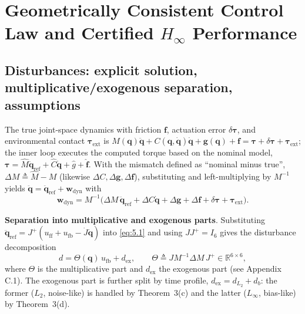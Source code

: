 \section{Geometrically Consistent Control Law and Certified $H_\infty$ Performance}

\subsection{Disturbances: explicit solution, multiplicative/exogenous separation, assumptions}

The true joint-space dynamics with friction $\boldsymbol f$, actuation error $\delta\boldsymbol\tau$, and environmental contact $\boldsymbol\tau_{\mathrm{ext}}$ is
$M(\boldsymbol q)\ddot{\boldsymbol q}+C(\boldsymbol q,\dot{\boldsymbol q})\dot{\boldsymbol q}+\boldsymbol g(\boldsymbol q)+\boldsymbol f=\boldsymbol\tau+\delta\boldsymbol\tau+\boldsymbol\tau_{\mathrm{ext}}$;
the inner loop executes the computed torque based on the nominal model, $\boldsymbol\tau=\hat M\ddot{\boldsymbol q}_{\mathrm{ref}}+\hat C\dot{\boldsymbol q}+\hat g+\hat{\boldsymbol f}$. With the mismatch defined as ``nominal minus true'', $\Delta M\triangleq\hat M-M$ (likewise $\Delta C,\Delta\boldsymbol g,\Delta\boldsymbol f$), substituting and left-multiplying by $M^{-1}$ yields $\ddot{\boldsymbol q}=\ddot{\boldsymbol q}_{\mathrm{ref}}+\boldsymbol w_{\mathrm{dyn}}$ with
\begin{equation}
\boldsymbol w_{\mathrm{dyn}}=M^{-1}\bigl(\Delta M\,\ddot{\boldsymbol q}_{\mathrm{ref}}+\Delta C\dot{\boldsymbol q}+\Delta\boldsymbol g+\Delta\boldsymbol f+\delta\boldsymbol\tau+\boldsymbol\tau_{\mathrm{ext}}\bigr).
\tag{5.1}\label{eq:5.1}
\end{equation}

\textbf{Separation into multiplicative and exogenous parts}. Substituting $\ddot{\boldsymbol q}_{\mathrm{ref}}=J^{+}(u_{\mathrm{ff}}+u_{\mathrm{fb}}-\dot J\dot{\boldsymbol q})$ into \eqref{eq:5.1} and using $JJ^{+}=I_6$ gives the disturbance decomposition
\begin{equation}
d=\Theta(\boldsymbol q)\,u_{\mathrm{fb}}+d_{\mathrm{ex}},\qquad
\Theta\triangleq J M^{-1}\Delta M\,J^{+}\in\mathbb R^{6\times6},
\tag{5.1d}\label{eq:5.1d}
\end{equation}
where $\Theta$ is the multiplicative part and $d_{\mathrm{ex}}$ the exogenous part (see Appendix C.1). The exogenous part is further split by time profile, $d_{\mathrm{ex}}=d_{L_2}+d_b$: the former ($L_2$, noise-like) is handled by Theorem~3(c) and the latter ($L_\infty$, bias-like) by Theorem~3(d).

